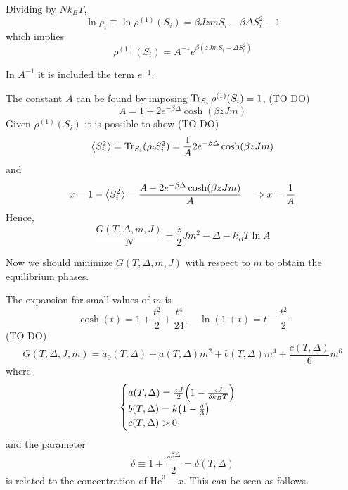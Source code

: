 \documentclass[../main/main.tex]{subfiles}
\begin{document}
Dividing by \( N k_B T \),
\begin{equation}
  \ln{\rho _i} \equiv \ln{\rho ^{(1)} (S_i)} =   \beta J z m S_i - \beta \Delta S_i^2 - 1
\end{equation}
which implies
\begin{equation}
  \rho ^{(1)} (S_i) = A^{-1} e^{\beta (zJmS_i - \Delta S_i^2)}
\end{equation}
\begin{remark}
In \( A^{-1} \) it is included the term \( e^{-1}  \).
\end{remark}
The constant \( A \) can be found by imposing \( \Tr_{S_i}\rho ^{(1)}(S_i) =1 \), (TO DO)
\begin{equation}
  A = 1 + 2 e^{-\beta \Delta } \cosh (\beta z J m)
\end{equation}
Given \( \rho ^{(1)}(S_i) \) it is possible to show (TO DO)
\begin{equation}
  \expval{S_i^2} = \Tr_{S_i}(\rho _i S_i^2) = \frac{1}{A} 2 e^{-\beta \Delta } \cosh ( \beta z J m)
\end{equation}
and
\begin{equation}
  x = 1 - \expval{S_i^2} = \frac{A - 2 e^{-\beta \Delta } \cosh (\beta z J m) }{A} \quad \Rightarrow x = \frac{1}{A}
\end{equation}
Hence,
\begin{equation}
  \frac{G(T,\Delta ,m,J)}{N} = \frac{z}{2} J m^2 - \Delta - k_B T \ln{A}
\end{equation}
\begin{remark}
Now we should minimize \( G(T,\Delta ,m,J) \) with respect to \( m \) to obtain the equilibrium phases.
\end{remark}
The expansion for small values of \( m \) is
\begin{equation}
  \cosh (t) = 1 + \frac{t^2}{2} + \frac{t^4}{24}, \quad \ln{(1+t)} = t - \frac{t^2}{2}
\end{equation}
(TO DO)
\begin{equation}
  G (T, \Delta , J, m) = a_0 (T, \Delta ) + a (T, \Delta ) m^2 + b (T,\Delta )m^4 + \frac{c(T, \Delta )}{6} m^6
\end{equation}
where
\begin{equation}
  \begin{cases}
   a (T, \Delta ) = \frac{z J}{2} \qty(1 - \frac{z J}{\delta k_B T}) \\
   b (T, \Delta ) = k \qty(1 - \frac{\delta }{3}) \\
    c (T, \Delta ) > 0
  \end{cases}
\end{equation}
and the parameter
\begin{equation}
  \delta \equiv  1 + \frac{e^{\beta \Delta } }{2} = \delta (T,\Delta )
\end{equation}
is related to the concentration of \( \text{He}^3-x \).
This can be seen as follows.
\end{document}
